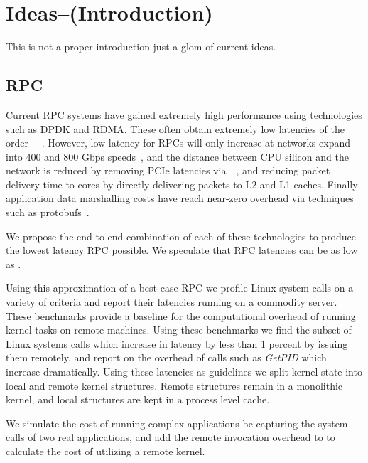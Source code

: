 \section{Ideas--(Introduction)}
\label{sec:intro}

This is not a proper introduction just a glom of current ideas.

\subsection{RPC}

Current RPC systems have gained extremely high performance using
technologies such as DPDK and RDMA. These often obtain extremely low
latencies of the order ~~. However, low latency for RPCs will only increase at networks
expand into 400 and 800 Gbps speeds~, and the distance
between CPU silicon and the network is reduced by removing PCIe
latencies via~~, and reducing packet delivery time to cores by directly
delivering packets to L2 and L1 caches. Finally application data
marshalling costs have reach near-zero overhead via techniques such as
protobufs~.

We propose the end-to-end combination of each of these technologies to
produce the lowest latency RPC possible. We speculate that RPC
latencies can be as low as .

Using this approximation of a best case RPC we profile Linux system
calls on a variety of criteria and report their latencies running on a
commodity server. These benchmarks provide a baseline for the
computational overhead of running kernel tasks on remote machines.
Using these benchmarks we find the subset of Linux systems calls which
increase in latency by less than 1 percent by issuing them remotely,
and report on the overhead of calls such as \emph{GetPID} which
increase dramatically. Using these latencies as guidelines we split
kernel state into local and remote kernel structures. Remote
structures remain in a monolithic kernel, and local structures are kept
in a process level cache.

We simulate the cost of running complex applications be capturing the
system calls of two real applications, and add the remote invocation
overhead to to calculate the cost of utilizing a remote kernel.


